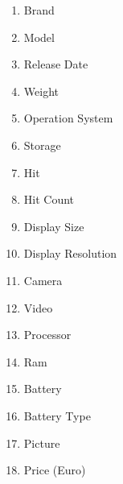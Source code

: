 \documentclass{svjour3}                     \smartqed  \usepackage{graphicx}
\begin{document}
\begin{multicols}{2}
    \begin{enumerate}
        \item Brand
        \item Model
        \item Release Date
        \item Weight
        \item Operation System
        \item Storage
        \item Hit
        \item Hit Count
        \item Display Size
        \item Display Resolution
        \item Camera
        \item Video
        \item Processor
        \item Ram
        \item Battery
        \item Battery Type
        \item Picture
        \item Price (Euro)
    \end{enumerate}
\end{multicols}
\end{document}
